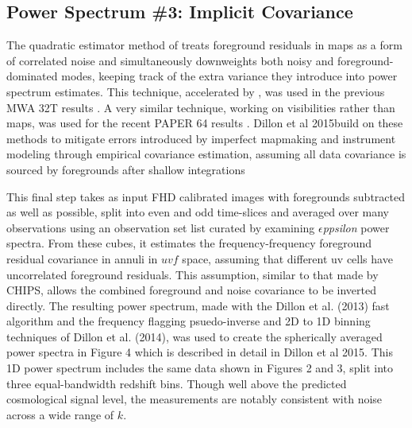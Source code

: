 \documentclass[preprint]{aastex}
\def\eppsilon{{\it $\epsilon$ppsilon }}
\def\dilloncite{Dillon et al 2015}
\begin{document}

\subsection{Power Spectrum \#3: Implicit Covariance}
\label{sec:implicit_cov}

The quadratic estimator method of \cite{Liu:2011p8763} treats foreground residuals in maps as a form of correlated noise and simultaneously downweights both noisy and foreground-dominated modes, keeping track of the extra variance they introduce into power spectrum estimates. This technique, accelerated by \cite{Dillon:2013p10497}, was used in the previous MWA 32T results \cite{Dillon:2014p9788}.  A very similar technique, working on visibilities rather than maps, was used for the recent PAPER 64 results  \cite{2015arXiv150206016A}.  \dilloncite build on these methods to mitigate errors introduced by imperfect mapmaking and instrument modeling through empirical covariance estimation, assuming all data covariance is sourced by foregrounds after shallow integrations

This final step takes as input FHD calibrated images with foregrounds subtracted as well as possible, split into even and odd time-slices and averaged over many observations using an observation set list curated by examining \eppsilon power spectra. From these cubes, it estimates the frequency-frequency foreground residual covariance in annuli in $uvf$ space, assuming that different uv cells have uncorrelated foreground residuals. This assumption, similar to that made by CHIPS, allows the combined foreground and noise covariance to be inverted directly. The resulting power spectrum, made with the Dillon et al. (2013) fast algorithm and the frequency flagging psuedo-inverse and 2D to 1D binning techniques of Dillon et al. (2014), was used to create the spherically averaged power spectra in Figure 4 which is described in detail in \dilloncite. This 1D power spectrum includes the same data shown in Figures 2 and 3, split into three equal-bandwidth redshift bins. Though well above the predicted cosmological signal level, the measurements are notably consistent with noise across a wide range of $k$. 
\end{document}
